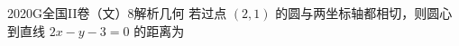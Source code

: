 
\begin{problem}{2020}{G}{全国II卷（文）}{8}{解析几何}
若过点 $ (2,1) $ 的圆与两坐标轴都相切，则圆心到直线 $ 2x-y-3=0 $ 的距离为
\begin{choices}
\end{choices}
\end{problem}

\begin{answer}

\end{answer}

\begin{solutions}

\end{solutions}